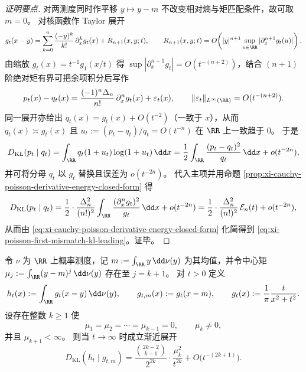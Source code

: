 \begin{proof}[证明要点]
对两测度同时作平移 \(y\mapsto y-m\) 不改变相对熵与矩匹配条件，故可取 \(m=0\)。
对核函数作 Taylor 展开
\[
g_t(x-y)=\sum_{k=0}^{n}\frac{(-y)^k}{k!}\,\partial_x^k g_t(x)+R_{n+1}(x,y;t),
\qquad
R_{n+1}(x,y;t)=O\!\left(|y|^{n+1}\sup_{u\in\RR}|\partial_x^{n+1}g_t(u)|\right).
\]
由缩放 \(g_t(x)=t^{-1}g_1(x/t)\) 得 \(\sup|\partial_x^{n+1}g_t|=O(t^{-(n+2)})\)，结合 \((n+1)\) 阶绝对矩有界可把余项积分后写作
\[
p_t(x)-q_t(x)=\frac{(-1)^n\Delta_n}{n!}\,\partial_x^n g_t(x)+\varepsilon_t(x),
\qquad \|\varepsilon_t\|_{L^\infty(\RR)}=O(t^{-(n+2)}).
\]
同一展开亦给出 \(q_t(x)=g_t(x)+O(t^{-2})\)（一致于 \(x\)），从而 \(q_t(x)\asymp g_t(x)\) 且
\(
u_t:=(p_t-q_t)/q_t=O(t^{-n})
\)
在 \(\RR\) 上一致趋于 \(0\)。
于是
\[
D_{\mathrm{KL}}(p_t\mid q_t)
=\int_{\RR} q_t(1+u_t)\log(1+u_t)\,\dd x
=\frac12\int_{\RR}\frac{(p_t-q_t)^2}{q_t}\,\dd x+o(t^{-2n}),
\]
并可将分母 \(q_t\) 以 \(g_t\) 替换且误差为 \(o(t^{-2n})\)。
代入主项并用命题 \ref{prop:xi-cauchy-poisson-derivative-energy-closed-form} 得
\[
D_{\mathrm{KL}}(p_t\mid q_t)
=\frac12\cdot\frac{\Delta_n^2}{(n!)^2}\int_{\RR}\frac{(\partial_x^n g_t)^2}{g_t}\,\dd x+o(t^{-2n})
=\frac12\cdot\frac{\Delta_n^2}{(n!)^2}\,\mathcal E_n(t)+o(t^{-2n}),
\]
从而由 \eqref{eq:xi-cauchy-poisson-derivative-energy-closed-form} 化简得到 \eqref{eq:xi-poisson-first-mismatch-kl-leading}。证毕。
\end{proof}

\begin{theorem}\label{thm:xi-cauchy-poisson-moment-gap-kl-leading}
令 \(\nu\) 为 \(\RR\) 上概率测度，记
\(
m:=\int_{\RR}y\,\dd\nu(y)
\)
为其均值，并令中心矩
\(
\mu_j:=\int_{\RR}(y-m)^j\,\dd\nu(y)
\)
存在至 \(j=k+1\)。
对 \(t>0\) 定义
\[
h_t(x):=\int_{\RR} g_t(x-y)\,\dd\nu(y),
\qquad
g_{t,m}(x):=g_t(x-m),
\qquad
g_t(x):=\frac{1}{\pi}\frac{t}{x^2+t^2}.
\]
设存在整数 \(k\ge 1\) 使
\[
\mu_1=\mu_2=\cdots=\mu_{k-1}=0,
\qquad
\mu_k\neq 0,
\]
并且 \(\mu_{k+1}<\infty\)。
则当 \(t\to\infty\) 时成立渐近展开
\begin{equation}\label{eq:xi-cauchy-poisson-moment-gap-kl-leading}
\boxed{\;
D_{\mathrm{KL}}(h_t\mid g_{t,m})
=\frac{\binom{2k-2}{k-1}}{2^{2k}}\cdot\frac{\mu_k^2}{t^{2k}}
+O\!\bigl(t^{-(2k+1)}\bigr).\;}
\end{equation}
\end{theorem}

